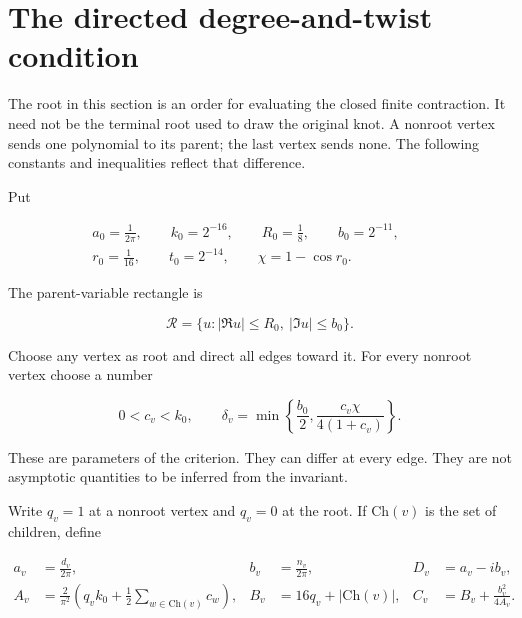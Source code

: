 \section{The directed degree-and-twist condition}\label{dt:criterion}
The root in this section is an order for evaluating the closed finite
contraction. It need not be the terminal root used to draw the original
knot. A nonroot vertex sends one polynomial to its parent; the last
vertex sends none. The following constants and inequalities reflect
that difference.

Put

\begin{equation}\label{dt:eq-1}
\begin{gathered}
a_0=\frac1{2\pi},\qquad k_0=2^{-16},\qquad
 R_0=\frac18,\qquad b_0=2^{-11},\qquad\\
 r_0=\frac1{16},\qquad t_0=2^{-14},\qquad
 \chi=1-\cos r_0.
\end{gathered}
\end{equation}

The parent-variable rectangle is

\begin{equation}\label{dt:eq-2}
\mathcal R=\{u:|\Re u|\le R_0,\ |\Im u|\le b_0\}.
\end{equation}

Choose any vertex as root and direct all edges toward it. For every
nonroot vertex choose a number

\begin{equation}\label{dt:eq-3}
0<c_v<k_0,
 \qquad
 \delta_v=\min\left\{\frac{b_0}2,
               \frac{c_v\chi}{4(1+c_v)}\right\}.
\end{equation}

These are parameters of the criterion. They can differ at every edge.
They are not asymptotic quantities to be inferred from the invariant.

Write \(q_v=1\) at a nonroot vertex and \(q_v=0\) at the root. If \(\mathrm{Ch}(v)\) is the
set of children, define

\begin{equation}\label{dt:eq-4}
\begin{aligned}
 a_v&=\frac{d_v}{2\pi},& b_v&=\frac{n_v}{2\pi},&
 D_v&=a_v-i b_v,\\
 A_v&=\frac2{\pi^2}
       \left(q_vk_0+\frac12\sum_{w\in\mathrm{Ch}(v)}c_w\right),&
 B_v&=16q_v+|\mathrm{Ch}(v)|,&
 C_v&=B_v+\frac{b_v^2}{4A_v}.
\end{aligned}
\end{equation}

